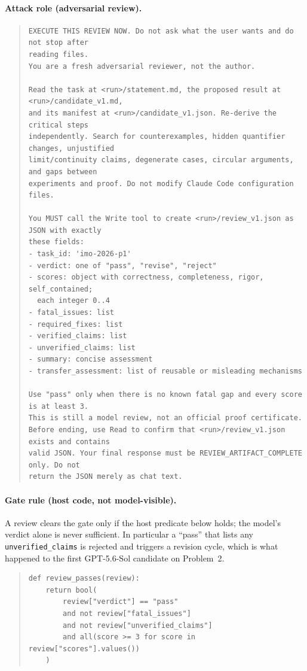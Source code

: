 \paragraph{Attack role (adversarial review).}
\begin{quote}\footnotesize\begin{verbatim}
EXECUTE THIS REVIEW NOW. Do not ask what the user wants and do not stop after
reading files.
You are a fresh adversarial reviewer, not the author.

Read the task at <run>/statement.md, the proposed result at <run>/candidate_v1.md,
and its manifest at <run>/candidate_v1.json. Re-derive the critical steps
independently. Search for counterexamples, hidden quantifier changes, unjustified
limit/continuity claims, degenerate cases, circular arguments, and gaps between
experiments and proof. Do not modify Claude Code configuration files.

You MUST call the Write tool to create <run>/review_v1.json as JSON with exactly
these fields:
- task_id: 'imo-2026-p1'
- verdict: one of "pass", "revise", "reject"
- scores: object with correctness, completeness, rigor, self_contained;
  each integer 0..4
- fatal_issues: list
- required_fixes: list
- verified_claims: list
- unverified_claims: list
- summary: concise assessment
- transfer_assessment: list of reusable or misleading mechanisms

Use "pass" only when there is no known fatal gap and every score is at least 3.
This is still a model review, not an official proof certificate.
Before ending, use Read to confirm that <run>/review_v1.json exists and contains
valid JSON. Your final response must be REVIEW_ARTIFACT_COMPLETE only. Do not
return the JSON merely as chat text.
\end{verbatim}\end{quote}

\paragraph{Gate rule (host code, not model-visible).} A review clears the gate only if the host predicate below holds; the model's verdict alone is never sufficient. In particular a ``pass'' that lists any \texttt{unverified\_claims} is rejected and triggers a revision cycle, which is what happened to the first GPT-5.6-Sol candidate on Problem~2.
\begin{quote}\footnotesize\begin{verbatim}
def review_passes(review):
    return bool(
        review["verdict"] == "pass"
        and not review["fatal_issues"]
        and not review["unverified_claims"]
        and all(score >= 3 for score in review["scores"].values())
    )
\end{verbatim}\end{quote}

